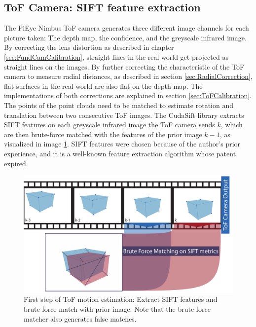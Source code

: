 \subsection{ToF Camera: SIFT feature extraction}
\label{sec:ToFPosition_SIFT}
The PiEye Nimbus ToF camera generates three different image channels for each picture taken: The depth map, the confidence, and the greyscale infrared image. By correcting the lens distortion as described in chapter \ref{sec:FundCamCalibration}, straight lines in the real world get projected as straight lines on the images. By further correcting the characteristic of the ToF camera to measure radial distances, as described in section \ref{sec:RadialCorrection}, flat surfaces in the real world are also flat on the depth map. The implementations of both corrections are explained in section \ref{sec:ToFCalibration}. \\
The points of the point clouds need to be matched to estimate rotation and translation between two consecutive ToF images. The CudaSift library\cite{cudaSiftRepo}\cite{CudaSiftPublication} extracts SIFT\cite{siftpaper} features on each greyscale infrared image the ToF camera sends $k$, which are then brute-force matched with the features of the prior image $k-1$, as visualized in image \ref{im:SiftExtraction}. SIFT features were chosen because of the author's prior experience, and it is a well-known feature extraction algorithm whose patent expired.\cite{siftpatent}
\begin{figure}[H]
    \centering
    \includegraphics[width=1.0\textwidth]{images/feature_matching_bruteforce.pdf}
    \caption{First step of ToF motion estimation: Extract SIFT features and brute-force match with prior image. Note that the brute-force matcher also generates false matches.}
    \label{im:SiftExtraction}
\end{figure}
